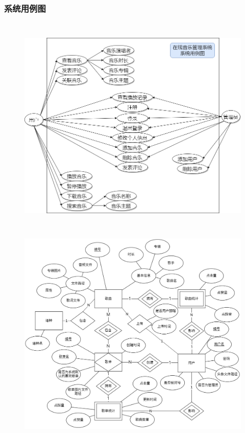 \documentclass[UTF8,14pt]{article}
\numberwithin{figure}{subsubsection}
\numberwithin{table}{subsubsection}
\begin{document}
\subsubsection{系统用例图}
\begin{center}
	\begin{figure}[H]
		\centering
		\includegraphics[width=13.181cm,height=10.655cm]{1.png}
	\end{figure}
\end{center}
\begin{center}
	\begin{figure}[H]
		\centering
		\includegraphics[width=11.28cm,height=9.91cm]{ER3.png}
	\end{figure}
\end{center}
\end{document}
